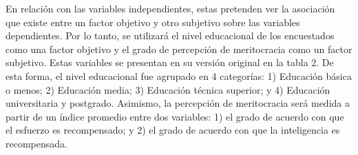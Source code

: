 \documentclass[
]{article}
\begin{document}
En relación con las variables independientes, estas pretenden ver la
asociación que existe entre un factor objetivo y otro subjetivo sobre
las variables dependientes. Por lo tanto, se utilizará el nivel
educacional de los encuestados como una factor objetivo y el grado de
percepción de meritocracia como un factor subjetivo. Estas variables se
presentan en su versión original en la tabla 2. De esta forma, el nivel
educacional fue agrupado en 4 categorías: 1) Educación básica o menos;
2) Educación media; 3) Educación técnica superior; y 4) Educación
universitaria y postgrado. Asimismo, la percepción de meritocracia será
medida a partir de un índice promedio entre dos variables: 1) el grado
de acuerdo con que el esfuerzo es recompensado; y 2) el grado de acuerdo
con que la inteligencia es recompensada.

\begin{table}[!h]


\end{table}
\end{document}
